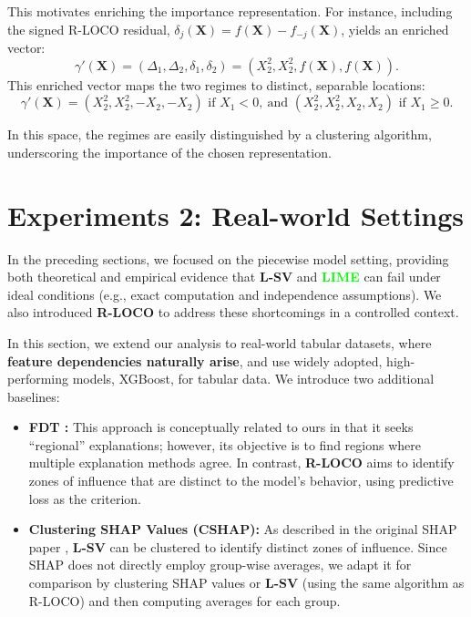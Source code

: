 \documentclass{article}
\theoremstyle{plain}
\theoremstyle{definition}
\theoremstyle{remark}
\newcommand{\ours}{\textcolor{ours}{\textbf{R-LOCO}}}
\newcommand{\lsv}{\textcolor{lsv}{\textbf{L-SV}}}
\newcommand{\lime}{\textcolor{lime}{\textbf{LIME}}}
\begin{document}
This motivates enriching the importance representation. For instance, including the signed R-LOCO residual, $\delta_j(\mathbf{X}) = f(\mathbf{X}) - f_{-j}(\mathbf{X})$, yields an enriched vector:
\[
\gamma'(\mathbf{X}) = (\Delta_1, \Delta_2, \delta_1, \delta_2) = (X_2^2, X_2^2, f(\mathbf{X}), f(\mathbf{X})).
\]
This enriched vector maps the two regimes to distinct, separable locations:
\[
\gamma'(\mathbf{X}) = (X_2^2, X_2^2, -X_2, -X_2) \text{ if } X_1 < 0,\ \text{and } (X_2^2, X_2^2, X_2, X_2) \text{ if } X_1 \ge 0.
\]

In this space, the regimes are easily distinguished by a clustering algorithm, underscoring the importance of the chosen representation.


\vspace{-0.3cm}
\section{Experiments 2: Real-world Settings}
\label{sec:real_world_experiments}
In the preceding sections, we focused on the piecewise model setting, providing both theoretical and empirical evidence that \lsv{} and \lime{} can fail under ideal conditions (e.g., exact computation and independence assumptions). We also introduced \ours{} to address these shortcomings in a controlled context. 

In this section, we extend our analysis to real-world tabular datasets, where \textbf{feature dependencies naturally arise}, and use widely adopted, high-performing models, XGBoost, for tabular data. We introduce two additional baselines:
\begin{itemize}
    \item \textbf{FDT \cite{laberge2024tackling}:} This approach is conceptually related to ours in that it seeks ``regional'' explanations; however, its objective is to find regions where multiple explanation methods agree. In contrast, \ours{} aims to identify zones of influence that are distinct to the model's behavior, using predictive loss as the criterion. 
    \item \textbf{Clustering SHAP Values (CSHAP):} As described in the original SHAP paper \citep{lundberg2018consistent}, \lsv{} can be clustered to identify distinct zones of influence. Since SHAP does not directly employ group-wise averages, we adapt it for comparison by clustering SHAP values or \lsv{} (using the same algorithm as R-LOCO) and then computing averages for each group.
\end{itemize}
\end{document}
